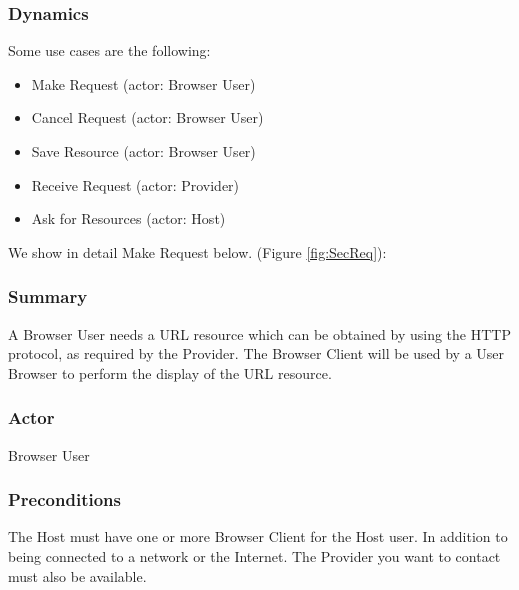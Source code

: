 \documentclass{sig-alternate-05-2015}
\begin{document}
    \subsubsection*{Dynamics}
    Some use cases are the following:
    \begin{itemize}
      \item Make Request (actor: Browser User)
      \item Cancel Request (actor: Browser User)
      \item Save Resource (actor: Browser User)
      \item Receive Request (actor: Provider)
      \item Ask for Resources (actor: Host)
    \end{itemize}
    We show in detail Make Request below. (Figure \ref{fig:SecReq}):
    \subsubsection*{Summary} A Browser User needs a URL resource which can be obtained by using the HTTP protocol, as required by the Provider. The Browser Client will be used by a User Browser to perform the display of the URL resource.
    \subsubsection*{Actor} Browser User
    \subsubsection*{Preconditions} The Host must have one or more Browser Client for the Host user. In addition to being connected to a network or the Internet. The Provider you want to contact must also be available.
\end{document}
